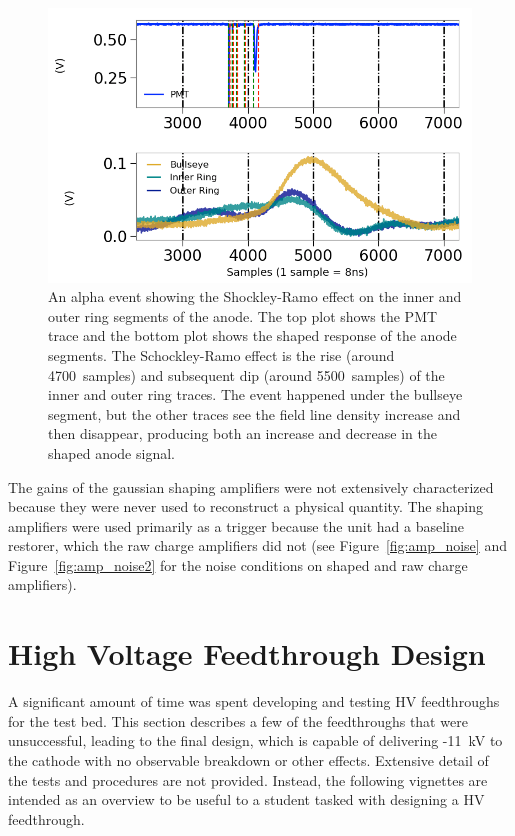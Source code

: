  \begin{figure}[htbp]
\begin{center}
\includegraphics[width =\textwidth ]{figures/testbed/shockley_ramo.png}
\caption{An alpha event showing the Shockley-Ramo effect on the inner and outer ring segments of the anode. The top plot shows the \acs{PMT} trace and the bottom plot shows the shaped response of the anode segments. The Schockley-Ramo effect is the rise (around 4700~samples) and subsequent dip (around 5500~samples) of the inner and outer ring traces. The event happened under the bullseye segment, but the other traces see the field line density increase and then disappear, producing both an increase and decrease in the shaped anode signal.  }
\label{fig:shockley_ramo}
\end{center}
\end{figure}


The gains of the gaussian shaping amplifiers were not extensively characterized because they were never used to reconstruct a physical quantity. The shaping amplifiers were used primarily as a trigger because the unit had a baseline restorer, which the raw charge amplifiers did not (see Figure~\ref{fig:amp_noise} and Figure~\ref{fig:amp_noise2} for the noise conditions on shaped and raw charge amplifiers).

\section{High Voltage Feedthrough Design}
A significant amount of time was spent developing and testing \ac{HV} feedthroughs for the test bed. This section describes a few of the feedthroughs that were unsuccessful, leading to the final design, which is capable of delivering -11~kV to the cathode with no observable breakdown or other effects. Extensive detail of the tests and procedures are not provided. Instead, the following vignettes are intended as an overview to be useful to a student tasked with designing a \ac{HV} feedthrough. 

